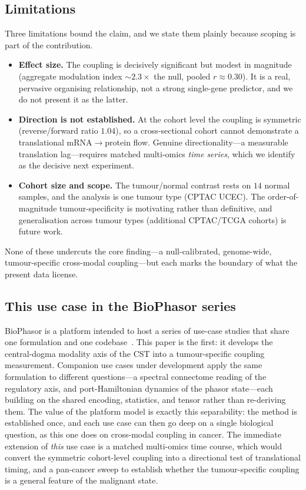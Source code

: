 \documentclass[preprint,12pt,amsmath,amssymb,superscriptaddress,floatfix]{revtex4-2}
\begin{document}
\subsection{Limitations}

Three limitations bound the claim, and we state them plainly because scoping is
part of the contribution.

\begin{itemize}
  \item \textbf{Effect size.} The coupling is decisively significant but modest in
  magnitude (aggregate modulation index $\sim\!2.3\times$ the null, pooled
  $r\approx0.30$). It is a real, pervasive organising relationship, not a strong
  single-gene predictor, and we do not present it as the latter.
  \item \textbf{Direction is not established.} At the cohort level the coupling is
  symmetric (reverse/forward ratio $1.04$), so a cross-sectional cohort cannot
  demonstrate a translational mRNA$\to$protein flow. Genuine directionality---a
  measurable translation lag---requires matched multi-omics \emph{time series},
  which we identify as the decisive next experiment.
  \item \textbf{Cohort size and scope.} The tumour/normal contrast rests on $14$
  normal samples, and the analysis is one tumour type (CPTAC UCEC). The
  order-of-magnitude tumour-specificity is motivating rather than definitive, and
  generalisation across tumour types (additional CPTAC/TCGA cohorts) is future
  work.
\end{itemize}

None of these undercuts the core finding---a null-calibrated, genome-wide,
tumour-specific cross-modal coupling---but each marks the boundary of what the
present data license.

\subsection{This use case in the BioPhasor series}

BioPhasor is a platform intended to host a series of use-case studies that share
one formulation and one codebase~\cite{biophasor_platform}. This paper is the
first: it develops the central-dogma modality axis of the CST into a
tumour-specific coupling measurement. Companion use cases under development apply
the same formulation to different questions---a spectral connectome reading of the
regulatory axis, and port-Hamiltonian dynamics of the phasor state---each building
on the shared encoding, statistics, and tensor rather than re-deriving them. The
value of the platform model is exactly this separability: the method is
established once, and each use case can then go deep on a single biological
question, as this one does on cross-modal coupling in cancer. The immediate
extension of \emph{this} use case is a matched multi-omics time course, which
would convert the symmetric cohort-level coupling into a directional test of
translational timing, and a pan-cancer sweep to establish whether the
tumour-specific coupling is a general feature of the malignant state.
\end{document}
